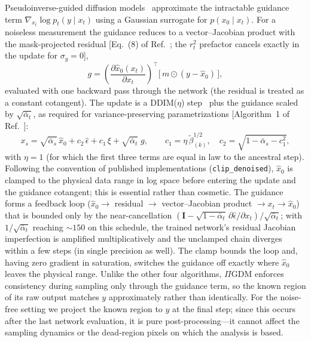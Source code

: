 Pseudoinverse-guided diffusion models~\cite{song2023pigdm} approximate
the intractable guidance term $\nabla_{x_t} \log p_t(y \mid x_t)$ using a
Gaussian surrogate for $p(x_0 \mid x_t)$.  For a noiseless measurement the
guidance reduces to a vector--Jacobian product with the mask-projected
residual [Eq.~(8) of Ref.~\cite{song2023pigdm}; the $r_t^2$ prefactor
cancels exactly in the update for $\sigma_y = 0$],
\begin{equation}
  g = \left(\frac{\partial \hat x_0(x_t)}{\partial x_t}\right)^{\!\!\top}
      \bigl[\, m \odot (y - \hat x_0)\,\bigr],
  \label{eq:pigdm-vjp}
\end{equation}
evaluated with one backward pass through the network (the residual is
treated as a constant cotangent).  The update is a DDIM($\eta$)
step~\cite{song2021ddim} plus the guidance scaled by
$\sqrt{\bar\alpha_t}$, as required for variance-preserving
parametrizations [Algorithm~1 of Ref.~\cite{song2023pigdm}]:
\begin{equation}
  x_s = \sqrt{\bar\alpha_s}\, \hat x_0
        + c_2\, \hat\epsilon
        + c_1\, \xi
        + \sqrt{\bar\alpha_t}\; g,
  \qquad
  c_1 = \eta\,\tilde\beta_{(k)}^{1/2},
  \quad
  c_2 = \sqrt{1 - \bar\alpha_s - c_1^2},
  \label{eq:pigdm-update}
\end{equation}
with $\eta = 1$ (for which the first three terms are equal in law to the
ancestral step).  Following the convention of published implementations
(\texttt{clip\_denoised}), $\hat x_0$ is clamped to the physical data
range in log space before entering the update and the guidance
cotangent; this is essential rather than cosmetic.  The guidance forms a
feedback loop ($\hat x_0 \to$ residual $\to$ vector--Jacobian product
$\to x_t \to \hat x_0$) that is bounded only by the near-cancellation
$(\mathbf{I} - \sqrt{1-\bar\alpha_t}\,\partial\hat\epsilon/\partial x_t)
/\sqrt{\bar\alpha_t}$; with $1/\sqrt{\bar\alpha_t}$ reaching
$\sim\!150$ on this schedule, the trained network's residual Jacobian
imperfection is amplified multiplicatively and the unclamped chain
diverges within a few steps (in single precision as well).  The clamp
bounds the loop and, having zero gradient in saturation, switches the
guidance off exactly where $\hat x_0$ leaves the physical range.
Unlike the other four algorithms, $\Pi$GDM enforces consistency during
sampling only through the guidance term, so the known region of its raw
output matches $y$ approximately rather than identically.  For the noise-free setting we project the known region to
$y$ at the final step; since this occurs after the last network
evaluation, it is pure post-processing---it cannot affect the sampling
dynamics or the dead-region pixels on which the analysis is based.

